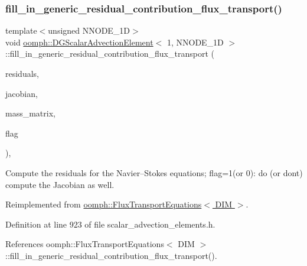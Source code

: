 \subsubsection{\texorpdfstring{fill\+\_\+in\+\_\+generic\+\_\+residual\+\_\+contribution\+\_\+flux\+\_\+transport()}{fill\_in\_generic\_residual\_contribution\_flux\_transport()}}
{\footnotesize\ttfamily template$<$unsigned N\+N\+O\+D\+E\+\_\+1D$>$ \\
void \hyperlink{classoomph_1_1DGScalarAdvectionElement}{oomph\+::\+D\+G\+Scalar\+Advection\+Element}$<$ 1, N\+N\+O\+D\+E\+\_\+1D $>$\+::fill\+\_\+in\+\_\+generic\+\_\+residual\+\_\+contribution\+\_\+flux\+\_\+transport (\begin{DoxyParamCaption}\item[{\hyperlink{classoomph_1_1Vector}{Vector}$<$ double $>$ \&}]{residuals,  }\item[{\hyperlink{classoomph_1_1DenseMatrix}{Dense\+Matrix}$<$ double $>$ \&}]{jacobian,  }\item[{\hyperlink{classoomph_1_1DenseMatrix}{Dense\+Matrix}$<$ double $>$ \&}]{mass\+\_\+matrix,  }\item[{unsigned}]{flag }\end{DoxyParamCaption})\hspace{0.3cm}{\ttfamily [inline]}, {\ttfamily [virtual]}}



Compute the residuals for the Navier--Stokes equations; flag=1(or 0)\+: do (or don\textquotesingle{}t) compute the Jacobian as well. 



Reimplemented from \hyperlink{classoomph_1_1FluxTransportEquations_a6994eab818eb7236e24e45b6fedec1f7}{oomph\+::\+Flux\+Transport\+Equations$<$ D\+I\+M $>$}.



Definition at line 923 of file scalar\+\_\+advection\+\_\+elements.\+h.



References oomph\+::\+Flux\+Transport\+Equations$<$ D\+I\+M $>$\+::fill\+\_\+in\+\_\+generic\+\_\+residual\+\_\+contribution\+\_\+flux\+\_\+transport().

\mbox{\label{classoomph_1_1DGScalarAdvectionElement_3_011_00_01NNODE__1D_01_4_ae2edc6f1cca20b5308f50e1ae24bd6cd}} 
